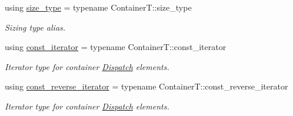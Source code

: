 \begin{DoxyCompactItemize}
using \hyperlink{classflow_1_1_dispatch_queue_afdc67058e3461410fdd6170046df55bc}{size\+\_\+type} = typename Container\+T\+::size\+\_\+type
\begin{DoxyCompactList}\small\item\em Sizing type alias. \end{DoxyCompactList}\item 
\mbox{\label{classflow_1_1_dispatch_queue_a307496fdc34a2d59e11114dabf85dc8a}} 
using \hyperlink{classflow_1_1_dispatch_queue_a307496fdc34a2d59e11114dabf85dc8a}{const\+\_\+iterator} = typename Container\+T\+::const\+\_\+iterator
\begin{DoxyCompactList}\small\item\em Iterator type for container \hyperlink{classflow_1_1_dispatch}{Dispatch} elements. \end{DoxyCompactList}\item 
\mbox{\label{classflow_1_1_dispatch_queue_ac74f1a9a8d77b06e9576492df2a50e4f}} 
using \hyperlink{classflow_1_1_dispatch_queue_ac74f1a9a8d77b06e9576492df2a50e4f}{const\+\_\+reverse\+\_\+iterator} = typename Container\+T\+::const\+\_\+reverse\+\_\+iterator
\begin{DoxyCompactList}\small\item\em Iterator type for container \hyperlink{classflow_1_1_dispatch}{Dispatch} elements. \end{DoxyCompactList}\end{DoxyCompactItemize}
